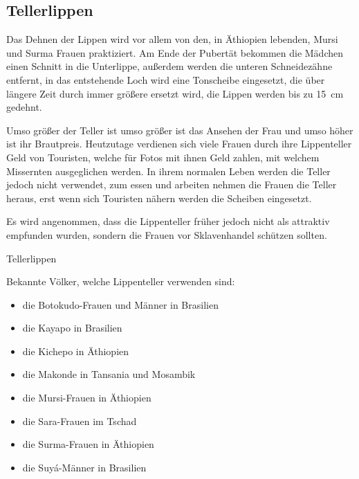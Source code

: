 \subsection{Tellerlippen}
Das Dehnen der Lippen wird vor allem von den, in Äthiopien lebenden, Mursi und Surma Frauen
praktiziert.
Am Ende der Pubertät
bekommen die Mädchen einen Schnitt in die Unterlippe, außerdem werden die unteren Schneidezähne
entfernt, in das entstehende Loch wird eine Tonscheibe eingesetzt, die über längere Zeit durch immer
größere ersetzt wird, die Lippen werden bis zu \SI{15}{\centi\metre} gedehnt.

Umso größer der Teller ist umso größer ist das Ansehen der Frau und umso höher ist ihr Brautpreis.
Heutzutage verdienen sich viele Frauen durch ihre Lippenteller Geld von Touristen, welche für Fotos
mit ihnen Geld zahlen, mit welchem Missernten ausgeglichen werden. In ihrem normalen Leben
werden
die Teller jedoch nicht verwendet, zum essen und arbeiten nehmen die Frauen die Teller heraus, erst
wenn sich Touristen nähern werden die Scheiben eingesetzt.

Es wird angenommen, dass die Lippenteller früher jedoch nicht als attraktiv empfunden wurden, sondern
die Frauen vor Sklavenhandel schützen sollten.

\begin{figurewrapper} %
	 \hfill
	\caption{Tellerlippen}
\end{figurewrapper}

\newpage
Bekannte Völker, welche Lippenteller verwenden sind:
\begin{multicols}{2}
\begin{itemize}
	\item die Botokudo-Frauen und Männer in Brasilien
	\item die Kayapo in Brasilien
	\item die Kichepo in Äthiopien
	\item die Makonde in Tansania und Mosambik
	\item die Mursi-Frauen in Äthiopien
	\item die Sara-Frauen im Tschad
	\item die Surma-Frauen in Äthiopien
	\item die Suyá-Männer in Brasilien
\end{itemize}
\end{multicols}


